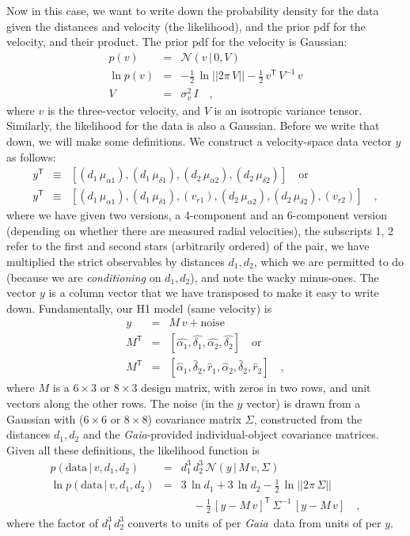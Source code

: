 \documentclass[manuscript, letterpaper]{aastex6}
\newcommand{\project}[1]{\textsl{#1}}
\newcommand{\gaia}{\project{Gaia}}
\newcommand{\given}{\,|\,}
\newcommand{\normal}{{\mathcal{N}}}
\newcommand{\transp}[1]{{#1}^{\!\mathsf{T}}}
\newcommand{\inv}[1]{{#1}^{-1}}
\newcommand{\data}{\mathrm{data}}
\begin{document}
Now in this case, we want to write down the probability density for the data
given the distances and velocity (the likelihood), and the prior pdf for
the velocity, and their product.
The prior pdf for the velocity is Gaussian:
\begin{eqnarray}
  p(v) &=& \normal(v\given 0,V)
  \\
  \ln p(v) &=& -\frac{1}{2}\,\ln||2\pi\,V|| -\frac{1}{2}\,\transp{v}\,\inv{V}\,v
  \\
  V &=& \sigma_v^2\,I
  \quad ,
\end{eqnarray}
where $v$ is the three-vector velocity, and $V$ is an isotropic
variance tensor.
Similarly, the likelihood for the data is also a Gaussian.
Before we write that down, we will make some definitions.
We construct a velocity-space data vector $y$ as follows:
\begin{eqnarray}
  \transp{y} &\equiv& [(d_1\,\mu_{\alpha1}), (d_1\,\mu_{\delta1}),
                       (d_2\,\mu_{\alpha2}), (d_2\,\mu_{\delta2})] \quad \mbox{or}
  \\
  \transp{y} &\equiv& [(d_1\,\mu_{\alpha1}), (d_1\,\mu_{\delta1}), (v_{r1}),
                       (d_2\,\mu_{\alpha2}), (d_2\,\mu_{\delta2}), (v_{r2})]
  \quad ,
\end{eqnarray}
where we have given two versions, a 4-component and an 6-component
version (depending on whether there are measured radial velocities),
the subscripts 1, 2 refer to the first and second stars (arbitrarily
ordered) of the pair, we have multiplied the strict observables by
distances $d_1, d_2$, which we are permitted to do (because we are
\emph{conditioning} on $d_1, d_2$), and note the wacky minus-ones.
The vector $y$ is a column vector that we have transposed to make it
easy to write down.
Fundamentally, our H1 model (same velocity) is
\begin{eqnarray}
  y &=& M\,v + \mathrm{noise}
  \\
  \transp{M} &=& [\hat{\alpha_1}, \hat{\delta_1},
                  \hat{\alpha_2}, \hat{\delta_2}] \quad \mbox{or}
  \\
  \transp{M} &=& [\hat{\alpha}_1, \hat{\delta}_2, \hat{r}_1,
                  \hat{\alpha}_2, \hat{\delta}_2, \hat{r}_2]
  \quad,
\end{eqnarray}
where $M$ is a $6\times 3$ or $8\times 3$ design matrix, with zeros
in two rows, and unit vectors along the other rows.
The noise (in the $y$ vector) is drawn from a Gaussian with ($6\times 6$ or $8\times 8$)
covariance matrix $\Sigma$, constructed from the distances $d_1, d_2$ and
the \gaia-provided individual-object covariance matrices.
Given all these definitions, the likelihood function is
\begin{eqnarray}
  p(\data\given v,d_1,d_2) &=& d_1^3\,d_2^3\,\normal(y\given M\,v, \Sigma)
  \\
  \ln p(\data\given v,d_1,d_2) &=& 3\,\ln d_1 + 3\,\ln d_2
  -\frac{1}{2}\,\ln||2\pi\,\Sigma|| \nonumber \\ && \quad
  -\frac{1}{2}\,\transp{[y-M\,v]}\,\inv{\Sigma}\,[y-M\,v]
  \quad ,
\end{eqnarray}
where the factor of $d_1^3\,d_2^3$ converts to units of per \gaia\ data
from units of per $y$.
\end{document}

